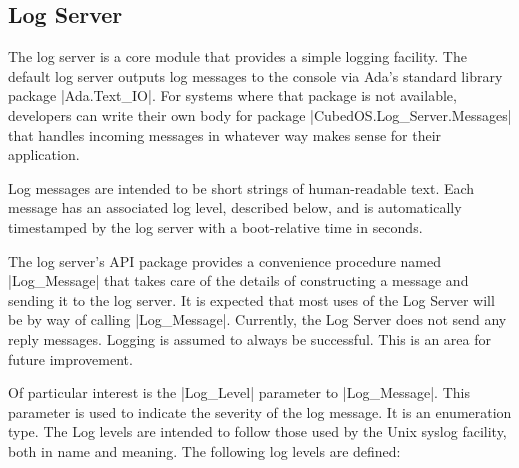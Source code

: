 \subsection{Log Server}
\label{sec:log-server}

The log server is a core module that provides a simple logging facility. The default log server
outputs log messages to the console via Ada's standard library package |Ada.Text_IO|. For
systems where that package is not available, developers can write their own body for package
|CubedOS.Log_Server.Messages| that handles incoming messages in whatever way makes sense for
their application.

Log messages are intended to be short strings of human-readable text. Each message has an
associated log level, described below, and is automatically timestamped by the log server with a
boot-relative time in seconds.

The log server's API package provides a convenience procedure named |Log_Message| that takes
care of the details of constructing a message and sending it to the log server. It is expected
that most uses of the Log Server will be by way of calling |Log_Message|. Currently, the Log
Server does not send any reply messages. Logging is assumed to always be successful. This is an
area for future improvement.

Of particular interest is the |Log_Level| parameter to |Log_Message|. This parameter is used to
indicate the severity of the log message. It is an enumeration type. The Log levels are intended
to follow those used by the Unix syslog facility, both in name and meaning. The following log
levels are defined:

